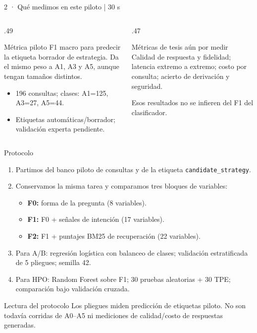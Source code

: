\documentclass[aspectratio=169,10pt]{beamer}
\begin{document}
\begin{frame}{2 · Qué medimos en este piloto | 30 s}
\begin{columns}[T]
\begin{column}{.49\textwidth}
\begin{block}{Métrica piloto}
F1 macro para predecir la etiqueta borrador de estrategia. Da el mismo peso a A1, A3 y A5, aunque tengan tamaños distintos.
\end{block}
\begin{itemize}
\item 196 consultas; clases: A1=125, A3=27, A5=44.
\item Etiquetas automáticas/borrador; validación experta pendiente.
\end{itemize}
\end{column}
\begin{column}{.47\textwidth}
\begin{block}{Métricas de tesis aún por medir}
Calidad de respuesta y fidelidad; latencia extremo a extremo; costo por consulta; acierto de derivación y seguridad.
\end{block}
\small Esos resultados no se infieren del F1 del clasificador.
\end{column}
\end{columns}
\end{frame}

\begin{frame}{Protocolo}
\begin{enumerate}
\item Partimos del banco piloto de consultas y de la etiqueta \texttt{candidate\_strategy}.
\item Conservamos la misma tarea y comparamos tres bloques de variables:
\begin{itemize}
\item \textbf{F0:} forma de la pregunta (8 variables).
\item \textbf{F1:} F0 + señales de intención (17 variables).
\item \textbf{F2:} F1 + puntajes BM25 de recuperación (22 variables).
\end{itemize}
\item Para A/B: regresión logística con balanceo de clases; validación estratificada de 5 pliegues; semilla 42.
\item Para HPO: Random Forest sobre F1; 30 pruebas aleatorias + 30 TPE; comparación bajo validación cruzada.
\end{enumerate}
\begin{alertblock}{Lectura del protocolo}
Los pliegues miden predicción de etiquetas piloto. No son todavía corridas de A0–A5 ni mediciones de calidad/costo de respuestas generadas.
\end{alertblock}
\end{frame}
\end{document}
